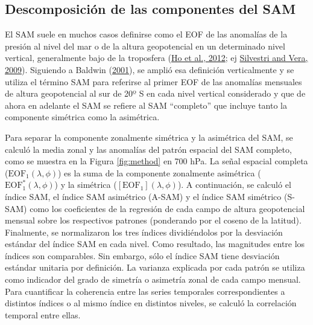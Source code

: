 \documentclass[12pt,oneside,a4paper]{reedthesis}
\begin{document}
\hypertarget{definition-of-indices}{%
\subsection{Descomposición de las componentes del SAM}\label{definition-of-indices}}

El SAM suele en muchos casos definirse como el EOF de las anomalías de la presión al nivel del mar o de la altura geopotencial en un determinado nivel vertical, generalmente bajo de la troposfera (\protect\hyperlink{ref-ho2012}{Ho et al., 2012}; ej \protect\hyperlink{ref-silvestri2009}{Silvestri and Vera, 2009}).
Siguiendo a Baldwin (\protect\hyperlink{ref-baldwin2001}{2001}), se amplió esa definición verticalmente y se utiliza el término SAM para referirse al primer EOF de las anomalías mensuales de altura geopotencial al sur de 20º S en cada nivel vertical considerado y que de ahora en adelante el SAM se refiere al SAM ``completo'' que incluye tanto la componente simétrica como la asimétrica.

Para separar la componente zonalmente simétrica y la asimétrica del SAM, se calculó la media zonal y las anomalías del patrón espacial del SAM completo, como se muestra en la Figura \ref{fig:method} en 700 hPa.
La señal espacial completa (\(\mathrm{EOF_1}(\lambda, \phi)\)) es la suma de la componente zonalmente asimétrica (\(\mathrm{EOF_1^*}(\lambda, \phi)\)) y la simétrica (\([\mathrm{EOF_1}](\lambda, \phi)\)).
A continuación, se calculó el índice SAM, el índice SAM asimétrico (A-SAM) y el índice SAM simétrico (S-SAM) como los coeficientes de la regresión de cada campo de altura geopotencial mensual sobre los respectivos patrones (ponderando por el coseno de la latitud).
Finalmente, se normalizaron los tres índices dividiéndolos por la desviación estándar del índice SAM en cada nivel.
Como resultado, las magnitudes entre los índices son comparables.
Sin embargo, sólo el índice SAM tiene desviación estándar unitaria por definición.
La varianza explicada por cada patrón se utiliza como indicador del grado de simetría o asimetría zonal de cada campo mensual.
Para cuantificar la coherencia entre las series temporales correspondientes a distintos índices o al mismo índice en distintos niveles, se calculó la correlación temporal entre ellas.
\end{document}

